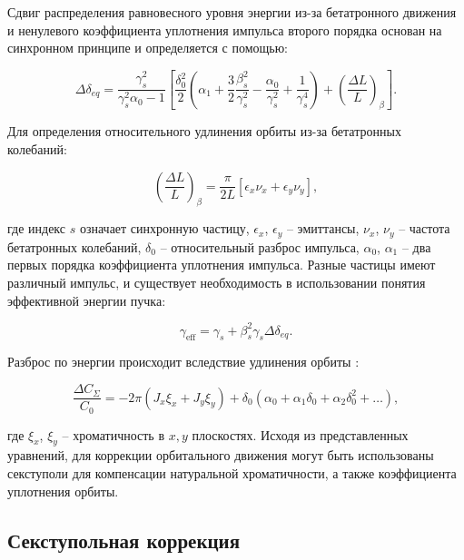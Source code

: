\par Сдвиг распределения равновесного уровня энергии из-за бетатронного движения и ненулевого коэффициента уплотнения импульса второго порядка основан на синхронном принципе \cite{Senichev:2013_decoherence} и определяется с помощью:

\begin{equation}
\Delta\delta_{eq}=\frac{\gamma_s^2}{\gamma_s^2\alpha_0-1}\left[\frac{\delta_0^2}{2}\left(\alpha_1+\frac{3}{2}\frac{\beta_s^2}{\gamma_s^2}-\frac{\alpha_0}{\gamma_s^2}+\frac{1}{\gamma_s^4}\right)+\left(\frac{\Delta L}{L}\right)_\beta\right].
\label{eq:equilibrium}
\end{equation}

\noindent Для определения относительного удлинения орбиты из-за бетатронных колебаний:

\begin{equation}
\left(\frac{\Delta L}{L}\right)_\beta=\frac{\pi}{2L}\left[\epsilon_x\nu_x+\epsilon_y\nu_y\right],
\end{equation}

\noindent где индекс $s$ означает синхронную частицу, $\epsilon_x$, $\epsilon_y$ – эмиттансы, $\nu_x$, $\nu_y$ – частота бетатронных колебаний, $\delta_0$ – относительный разброс импульса, $\alpha_0$, $\alpha_1$ – два первых порядка коэффициента уплотнения импульса. Разные частицы имеют различный импульс, и существует необходимость в использовании понятия эффективной энергии пучка:

\begin{equation}
	\gamma_{\text{eff}}=\gamma_s+\beta_s^2\gamma_s\Delta\delta_{eq}.
\end{equation}

\par Разброс по энергии происходит вследствие удлинения орбиты \cite{orbit_length}:

\begin{equation}
\frac{\Delta C_\Sigma}{C_{0}}
=-2\pi\left(J_x\xi_x+J_y\xi_y\right)+\delta_0\left(\alpha_0+\alpha_1\delta_0+\alpha_2\delta_0^2+\ldots\right),
\label{eq:orbit_length}
\end{equation}

\noindent где $\xi_x$, $\xi_y$ – хроматичность в $x, y$ плоскостях. Исходя из представленных уравнений, для коррекции орбитального движения могут быть использованы секступоли для компенсации натуральной хроматичности, а также коэффициента уплотнения орбиты.

		\subsection{Секступольная коррекция}\label{sec:EDM/Wien_filter_tracking/sextupole_correction}

